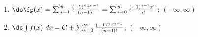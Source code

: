 {
{\begin{enumerate}
        \item $\ds \fp(x) = \sum_{n=1}^\infty \frac{(-1)^nx^{n-1}}{(n-1)!} =\sum_{n=0}^\infty \frac{(-1)^{n+1}x^{n}}{n!}$; \quad $(-\infty,\infty)$
        \item   $\ds \int f(x)\ dx = C+\sum_{n=0}^\infty \frac{(-1)^{n}x^{n+1}}{(n+1)!}$; \quad $(-\infty,\infty)$
\end{enumerate}}

}

